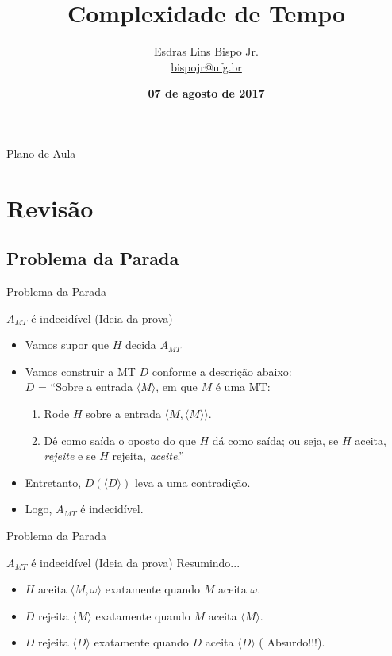 \documentclass[xcolor=dvipsnames,table]{beamer}
\title{Complexidade de Tempo}
\author{
  Esdras Lins Bispo Jr. \\ \url{bispojr@ufg.br}
  }
\institute{
  Teoria da Computação \\Bacharelado em Ciência da Computação}
\date{\textbf{07 de agosto de 2017} }
\begin{document}
	\begin{frame}
		\titlepage
	\end{frame}

	\AtBeginSection{
		\begin{frame}{Sumário}%
    		\tableofcontents[currentsection]
		\end{frame}
	}

	\begin{frame}{Plano de Aula}
		\tableofcontents
	\end{frame}
    
    \section{Revisão}
	
	\subsection{Problema da Parada}
	\begin{frame}{Problema da Parada}
		\begin{block}{$A_{MT}$ é indecidível (Ideia da prova)}
			\begin{itemize}
				\item Vamos supor que $H$ decida $A_{MT}$   
				\item Vamos construir a MT $D$ conforme a descrição abaixo:\\   
				$D$ = ``Sobre a entrada $\langle M \rangle$, em que $M$ é uma MT:
				\begin{enumerate}
					\item Rode $H$ sobre a entrada $\langle M, \langle M \rangle \rangle$.
					\item Dê como saída o oposto do que $H$ dá como saída; ou seja, se $H$ aceita, {\it rejeite} e se $H$ rejeita, {\it aceite}.''
				\end{enumerate}   
				\item Entretanto, $D(\langle D \rangle)$ leva a uma contradição.   
				\item Logo, $A_{MT}$ é indecidível.
			\end{itemize}
		\end{block}
	\end{frame}

	\begin{frame}{Problema da Parada}
		\begin{block}{$A_{MT}$ é indecidível (Ideia da prova)}
			Resumindo...   
			\begin{itemize}
				\item $H$ aceita $\langle M, \omega \rangle$ exatamente quando $M$ aceita $\omega$.   
				\item $D$ rejeita $\langle M \rangle$ exatamente quando $M$ aceita $\langle M \rangle$.   
				\item $D$ rejeita $\langle D \rangle$ exatamente quando $D$ aceita $\langle D \rangle$ ({\color{red} Absurdo!!!}).
			\end{itemize}
		\end{block}
	\end{frame}
\end{document}
